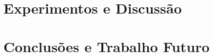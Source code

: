 \documentclass[10pt,twocolumn,letterpaper]{article}
\begin{document}

\section{Experimentos e Discussão}


%
%
%
%

\section{Conclusões e Trabalho Futuro}



{\small


}
\end{document}
